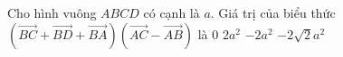 \begin{ex}%
	Cho hình vuông $ABCD$ có cạnh là $a$. Giá trị của biểu thức $\left(\overrightarrow{BC}+\overrightarrow{BD}+\overrightarrow{BA}\right)\left(\overrightarrow{AC}-\overrightarrow{AB}\right)$ là
	\choice
	{$0$}
	{\True $2a^2$}
	{$-2a^2$}
	{$-2\sqrt{2}a^2$}
\end{ex}
